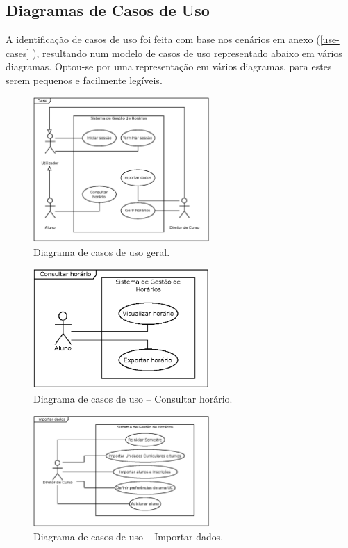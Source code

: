 \documentclass[12pt, a4paper]{article}
\begin{document}
\subsection{Diagramas de Casos de Uso}

A identificação de casos de uso foi feita com base nos cenários em anexo
(\ref{use-cases} ), resultando num modelo de casos de uso representado abaixo em
vários diagramas. Optou-se por uma representação em vários diagramas, para estes serem pequenos e
facilmente legíveis.

\begin{figure}[H]
    \centering
    \includegraphics[width=0.6\textwidth]{Imagens/Modelos/UseCasesGeral.eps}
    \caption{Diagrama de casos de uso geral.}
\end{figure}

\begin{figure}[H]
    \centering
    \includegraphics[width=0.6\textwidth]{Imagens/Modelos/UseCasesConsultarHorario.eps}
    \caption{Diagrama de casos de uso -- Consultar horário.}
\end{figure}

\begin{figure}[H]
    \centering
    \includegraphics[width=0.6\textwidth]{Imagens/Modelos/UseCasesImportarDados.eps}
    \caption{Diagrama de casos de uso -- Importar dados.}
\end{figure}
\end{document}
